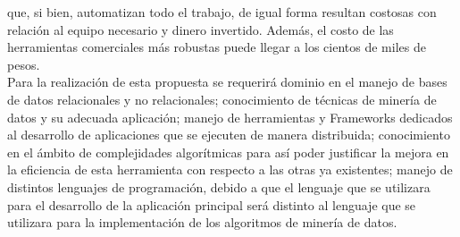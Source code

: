 que, si bien, automatizan todo el trabajo, de igual forma resultan costosas con relación al equipo necesario y dinero invertido.
Además, el costo de las herramientas comerciales más robustas puede llegar a los cientos de miles de pesos.
\\
Para la realización de esta propuesta se requerirá dominio en el manejo de bases de datos relacionales y no relacionales;
conocimiento de técnicas de minería de datos y su adecuada aplicación; manejo de herramientas y Frameworks dedicados al
desarrollo de aplicaciones que se ejecuten de manera distribuida; conocimiento en el ámbito de complejidades algorítmicas
para así poder justificar la mejora en la eficiencia de esta herramienta con respecto a las otras ya existentes; manejo de distintos
lenguajes de programación, debido a que el lenguaje que se utilizara para el desarrollo de la aplicación principal será distinto al
lenguaje que se utilizara para la implementación de los algoritmos de minería de datos.